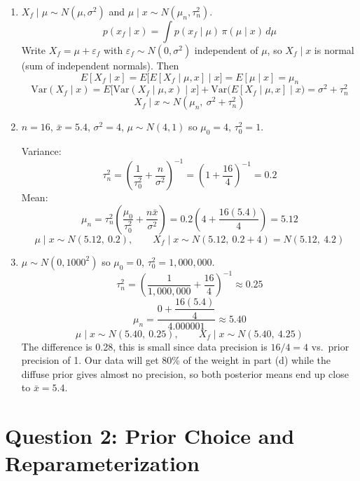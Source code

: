 \documentclass[11pt]{article}
\begin{document}
\begin{enumerate}
If $\dfrac{n}{\sigma^2} > \dfrac{1}{\tau_0^2}$, $w$ is closer to 1 and posterior mean is closer to $\bar{x}$.

If prior precision $\dfrac{1}{\tau_0^2}$ is bigger, then $w$ is closer to 0 and our posterior mean is closer to $\mu_0$.

\item $X_f \mid \mu \sim N(\mu, \sigma^2)$ and $\mu \mid x \sim N(\mu_n, \tau_n^2)$.
\[
p(x_f \mid x) = \int p(x_f \mid \mu)\,\pi(\mu \mid x)\,d\mu
\]
Write $X_f = \mu + \varepsilon_f$ with $\varepsilon_f \sim N(0, \sigma^2)$ independent of $\mu$, so $X_f \mid x$ is normal (sum of independent normals). Then
\[
E[X_f \mid x] = E\big[E[X_f \mid \mu, x] \mid x\big] = E[\mu \mid x] = \mu_n
\]
\[
\text{Var}(X_f \mid x) = E\big[\text{Var}(X_f \mid \mu, x) \mid x\big] + \text{Var}\big(E[X_f \mid \mu, x] \mid x\big) = \sigma^2 + \tau_n^2
\]
\[
\boxed{X_f \mid x \sim N(\mu_n,\ \sigma^2 + \tau_n^2)}
\]

\item $n = 16$, $\bar{x} = 5.4$, $\sigma^2 = 4$, $\mu \sim N(4,1)$ so $\mu_0 = 4$, $\tau_0^2 = 1$.

Variance:
\[
\tau_n^2 = \left(\frac{1}{\tau_0^2} + \frac{n}{\sigma^2}\right)^{-1} = \left(1 + \frac{16}{4}\right)^{-1} = \boxed{0.2}
\]
Mean:
\[
\mu_n = \tau_n^2\left(\frac{\mu_0}{\tau_0^2} + \frac{n\bar{x}}{\sigma^2}\right) = 0.2\left(4 + \frac{16(5.4)}{4}\right) = \boxed{5.12}
\]
\[
\boxed{\mu \mid x \sim N(5.12,\ 0.2)}, \qquad
\boxed{X_f \mid x \sim N(5.12,\ 0.2 + 4) = N(5.12,\ 4.2)}
\]

\item $\mu \sim N(0, 1000^2)$ so $\mu_0 = 0$, $\tau_0^2 = 1{,}000{,}000$.
\[
\tau_n^2 = \left(\frac{1}{1{,}000{,}000} + \frac{16}{4}\right)^{-1} \approx \boxed{0.25}
\]
\[
\mu_n = \frac{0 + \dfrac{16(5.4)}{4}}{4.000001} \approx \boxed{5.40}
\]
\[
\boxed{\mu \mid x \sim N(5.40,\ 0.25)}, \qquad \boxed{X_f \mid x \sim N(5.40,\ 4.25)}
\]
The difference is 0.28, this is small since data precision is $16/4 = 4$ vs.\ prior precision of 1. Our data will get 80\% of the weight in part (d) while the diffuse prior gives almost no precision, so both posterior means end up close to $\bar{x} = 5.4$.
\end{enumerate}

\section*{Question 2: Prior Choice and Reparameterization}
\end{document}

